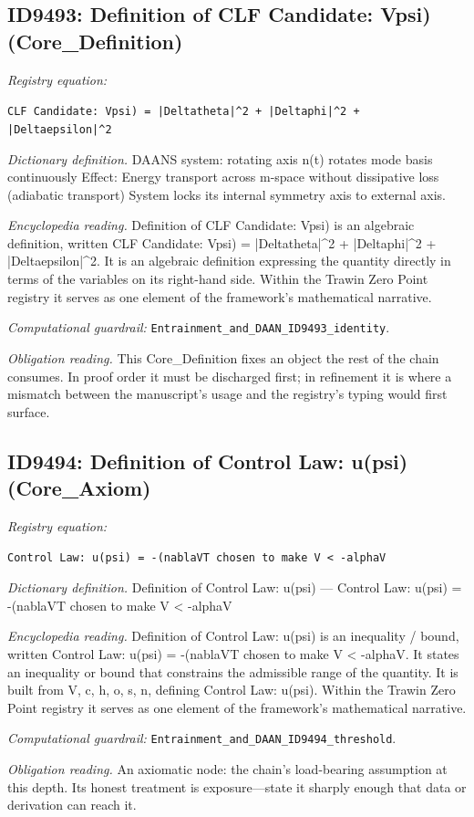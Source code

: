 \documentclass[11pt]{article}
\theoremstyle{remark}
\begin{document}
\subsection{ID9493: Definition of CLF Candidate: Vpsi) (Core\_Definition)}

\noindent\textit{Registry equation:}\par
{\small\texttt{CLF Candidate: Vpsi) = |Deltatheta|\textasciicircum{}2 + |Deltaphi|\textasciicircum{}2 + |Deltaepsilon|\textasciicircum{}2}}\par\medskip
\noindent\textit{Dictionary definition.} DAANS system: rotating axis n(t) rotates mode basis continuously Effect: Energy transport across m-space without dissipative loss (adiabatic transport) System locks its internal symmetry axis to external axis.\par\medskip
\noindent\textit{Encyclopedia reading.} Definition of CLF Candidate: Vpsi) is an algebraic definition, written CLF Candidate: Vpsi) = |Deltatheta|\textasciicircum{}2 + |Deltaphi|\textasciicircum{}2 + |Deltaepsilon|\textasciicircum{}2. It is an algebraic definition expressing the quantity directly in terms of the variables on its right-hand side. Within the Trawin Zero Point registry it serves as one element of the framework's mathematical narrative.
\par\medskip\noindent\textit{Computational guardrail:} \texttt{Entrainment\_and\_DAAN\_ID9493\_identity}.
\par\medskip\noindent\textit{Obligation reading.} This Core\_Definition fixes an object the rest of the chain consumes. In proof order it must be discharged first; in refinement it is where a mismatch between the manuscript's usage and the registry's typing would first surface.

\subsection{ID9494: Definition of Control Law: u(psi) (Core\_Axiom)}

\noindent\textit{Registry equation:}\par
{\small\texttt{Control Law: u(psi) = -(nablaVT chosen to make V < -alphaV}}\par\medskip
\noindent\textit{Dictionary definition.} Definition of Control Law: u(psi) --- Control Law: u(psi) = -(nablaVT chosen to make V < -alphaV\par\medskip
\noindent\textit{Encyclopedia reading.} Definition of Control Law: u(psi) is an inequality / bound, written Control Law: u(psi) = -(nablaVT chosen to make V < -alphaV. It states an inequality or bound that constrains the admissible range of the quantity. It is built from V, c, h, o, s, n, defining Control Law: u(psi). Within the Trawin Zero Point registry it serves as one element of the framework's mathematical narrative.
\par\medskip\noindent\textit{Computational guardrail:} \texttt{Entrainment\_and\_DAAN\_ID9494\_threshold}.
\par\medskip\noindent\textit{Obligation reading.} An axiomatic node: the chain's load-bearing assumption at this depth. Its honest treatment is exposure---state it sharply enough that data or derivation can reach it.
\end{document}
